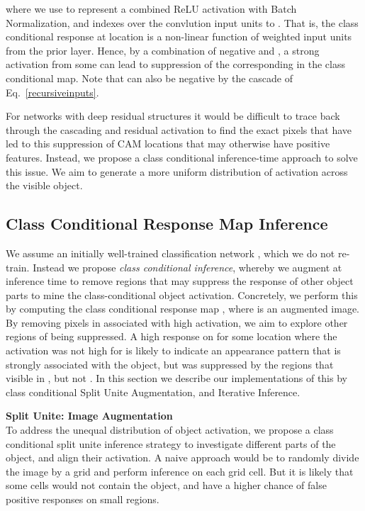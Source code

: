 \documentclass[10pt,twocolumn,letterpaper]{article}
\begin{document}
where we use  to represent a combined ReLU activation with Batch Normalization, and  indexes over the convlution  input units to .
That is, the class conditional response at location  is a non-linear function of weighted input units  from the prior layer.
Hence, by a combination of negative  and , a strong activation from some  can lead to suppression of the corresponding  in the class 
conditional map. Note that  can also be negative by the cascade of Eq.~\ref{recursiveinputs}. 

For networks with deep residual structures it would be difficult to trace back through the cascading and residual activation to find the exact pixels that have led to this suppression of CAM locations that may otherwise have positive features. 
Instead, we propose a class conditional inference-time approach to solve this issue. We aim to generate a more uniform distribution of activation across the visible object.

\subsection{Class Conditional Response Map Inference}
We assume an initially well-trained classification network , which we do not re-train. Instead we propose \emph{class conditional inference}, whereby we augment  at inference time to remove regions that may suppress the response of other object parts  to mine the class-conditional object activation. 
Concretely, we perform this by computing the class conditional response map , where  is an augmented image. 
By removing pixels in  associated with high activation, we aim to explore other regions of being suppressed. A high response on  for some location where the activation was not high for  
 is likely to indicate an appearance pattern that is strongly associated with the object, but was suppressed by the regions that visible in , but not . In this section we describe our implementations of this by class conditional Split  Unite Augmentation, and Iterative Inference.





\noindent\textbf{Split  Unite: Image Augmentation}\\
\label{sec:split}
To address the unequal distribution of object activation, we propose a class conditional split  unite inference strategy to investigate different parts of the object, and align their activation.
A naive approach would be to randomly divide the image by a grid and perform inference on each grid cell. But it is likely that some cells would not
contain the object, and have a higher chance of false positive responses on small regions. 
\end{document}
